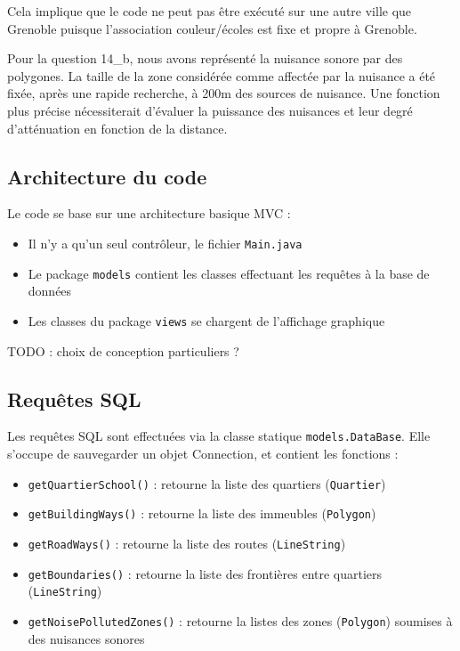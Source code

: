 \documentclass[12pt,a4paper]{article}
\begin{document}
Cela implique que le code ne peut pas être exécuté sur une autre ville que Grenoble puisque l'association couleur/écoles est fixe et propre à Grenoble.

Pour la question 14\_b, nous avons représenté la nuisance sonore par des polygones. La taille de la zone considérée comme affectée par la nuisance a été fixée, après une rapide recherche, à 200m des sources de nuisance. Une fonction plus précise nécessiterait d'évaluer la puissance des nuisances et leur degré d'atténuation en fonction de la distance.

\subsection*{Architecture du code}

Le code se base sur une architecture basique MVC :

\begin{itemize}
\item Il n'y a qu'un seul contrôleur, le fichier \verb?Main.java?
\item Le package \verb?models? contient les classes effectuant les requêtes à la base de données \item Les classes du package \verb?views? se chargent de l'affichage graphique
\end{itemize}

TODO : choix de conception particuliers ?

\subsection*{Requêtes SQL}

Les requêtes SQL sont effectuées via la classe statique \verb?models.DataBase?. Elle s'occupe de sauvegarder un objet Connection, et contient les fonctions :
\begin{itemize}
	\item \verb?getQuartierSchool()? : retourne la liste des quartiers (\verb?Quartier?)
	\item \verb?getBuildingWays()? : retourne la liste des immeubles (\verb?Polygon?)
	\item \verb?getRoadWays()? : retourne la liste des routes (\verb?LineString?)
    \item \verb?getBoundaries()? : retourne la liste des frontières entre quartiers (\verb?LineString?)
    \item \verb?getNoisePollutedZones()? : retourne la listes des zones (\verb?Polygon?) soumises à des nuisances sonores
\end{itemize}
\end{document}
